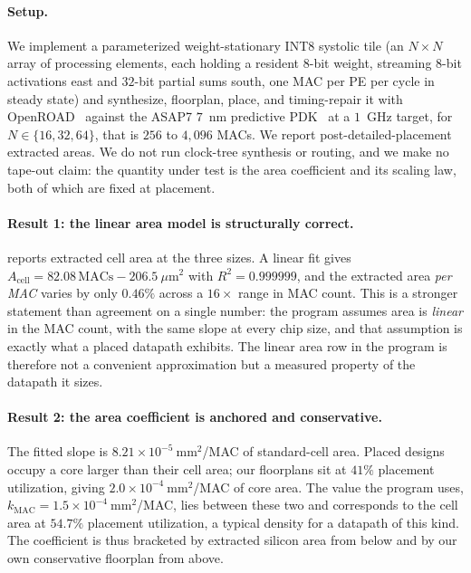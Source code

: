 \paragraph{Setup.}
We implement a parameterized weight-stationary INT8 systolic tile (an
$N \times N$ array of processing elements, each holding a resident $8$-bit
weight, streaming $8$-bit activations east and $32$-bit partial sums south, one
MAC per PE per cycle in steady state) and synthesize, floorplan, place, and
timing-repair it with OpenROAD~\citep{ajayi2019openroad} against the ASAP7
$7$~nm predictive PDK~\citep{clark2016asap7} at a $1$~GHz target, for
$N \in \{16, 32, 64\}$, that is $256$ to $4{,}096$ MACs. We report post-detailed-placement
extracted areas. We do not run clock-tree synthesis or routing, and we make no
tape-out claim: the quantity under test is the area coefficient and its scaling
law, both of which are fixed at placement.

\paragraph{Result 1: the linear area model is structurally correct.}
 reports extracted cell area at the three sizes. A linear fit
gives $A_{\mathrm{cell}} = 82.08\,\mathrm{MACs} - 206.5\ \mu\mathrm{m}^2$ with
$R^2 = 0.999999$, and the extracted area \emph{per MAC} varies by only $0.46\%$
across a $16\times$ range in MAC count. This is a stronger statement than
agreement on a single number: the program assumes area is
\emph{linear} in the MAC count, with the same slope at every chip size, and
that assumption is exactly what a placed datapath exhibits. The linear area row
in the program is therefore not a convenient approximation but a measured
property of the datapath it sizes.

\paragraph{Result 2: the area coefficient is anchored and conservative.}
The fitted slope is $8.21 \times 10^{-5}\ \mathrm{mm}^2$/MAC of standard-cell
area. Placed designs occupy a core larger than their cell area; our floorplans
sit at $41\%$ placement utilization, giving $2.0 \times 10^{-4}\
\mathrm{mm}^2$/MAC of core area. The value the program uses,
$k_{\mathrm{MAC}} = 1.5 \times 10^{-4}\ \mathrm{mm}^2$/MAC, lies between these
two and corresponds to the cell area at $54.7\%$ placement utilization, a
typical density for a datapath of this kind. The coefficient is thus bracketed
by extracted silicon area from below and by our own conservative floorplan from
above.

